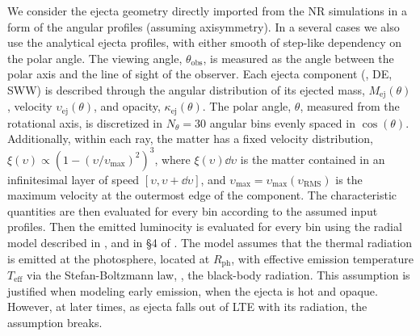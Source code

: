 We consider the ejecta geometry directly imported from the 
\ac{NR} simulations in a form of the angular profiles 
(assuming axisymmetry).
In a several cases we also use the analytical ejecta profiles, with 
either smooth of step-like dependency on the polar angle.
%
The viewing angle, $\theta_{\text{obs}}$, is measured as the angle between the 
polar axis and the line of sight of the observer.
Each ejecta component (\eg, \ac{DE}, \ac{SWW}) is described through 
the angular distribution of its ejected mass, $M_{\text{ej}}(\theta)$, 
velocity $\upsilon_{\text{ej}}(\theta)$,
and opacity, $\kappa_{\text{ej}}(\theta)$.
%
The polar angle, $\theta$, measured from the rotational axis, is discretized in 
$N_\theta=30$ angular bins evenly spaced in $\cos{(\theta)}$.
%
Additionally, within each ray, the matter 
has a fixed velocity distribution, 
$\xi(\upsilon) \propto (1 - (\upsilon / \upsilon_{\text{max}})^2)^3$,
%
%
where $\xi(\upsilon) \dd \upsilon$ is the matter contained in an infinitesimal layer of speed 
$\left[\upsilon,\upsilon+\dd \upsilon\right]$, and 
$\upsilon_{\text{max}}=\upsilon_{\text{max}}(\upsilon_{\text{RMS}})$ 
is the maximum velocity at the outermost edge of the component.
%
The characteristic quantities 
are then evaluated 
for every bin according to the assumed input profiles.
Then the emitted luminocity is evaluated for every bin 
using the radial model described in \citet{Perego:2017wtu}, and in 
\S{4} of \citet{Barbieri:2019kli}.
%
The model assumes that the thermal radiation is emitted at the photosphere, located at 
$R_{\text{ph}}$, with effective emission temperature $T_{\text{eff}}$ via the 
Stefan-Boltzmann law, \ie, the black-body radiation. This assumption is justified 
when modeling early emission, when the ejecta is hot and opaque. However, at later 
times, as ejecta falls out of \ac{LTE} with its radiation, the assumption breaks.
%

